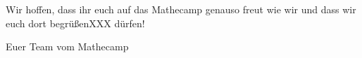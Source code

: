 \documentclass{zettel}
\begin{document}
Wir hoffen, dass ihr euch auf das Mathecamp genauso freut wie wir und dass wir
euch dort begrüßenXXX dürfen!

\vspace{2em}

Euer Team vom Mathecamp

\end{document}
